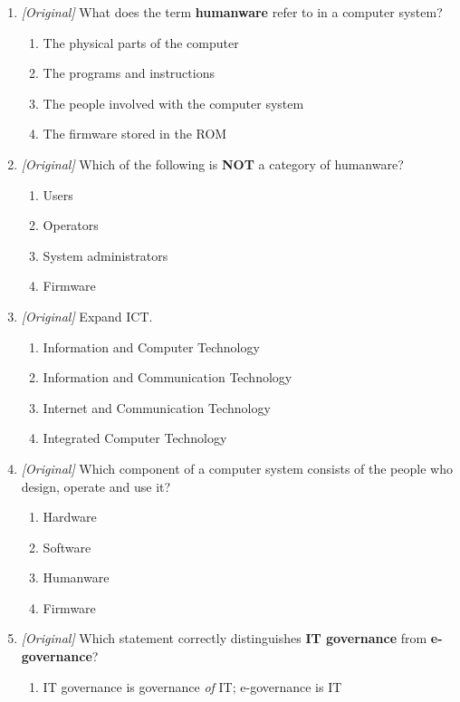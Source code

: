\begin{enumerate}[label=\textbf{Q\arabic*.}, leftmargin=*]
\item \textit{[Original]} What does the term \textbf{humanware} refer to in a
  computer system?
  \begin{enumerate}[label=\Alph*.]
    \item The physical parts of the computer
    \item The programs and instructions
    \item The people involved with the computer system
    \item The firmware stored in the ROM
  \end{enumerate}
\item \textit{[Original]} Which of the following is \textbf{NOT} a category of
  humanware?
  \begin{enumerate}[label=\Alph*.]
    \item Users
    \item Operators
    \item System administrators
    \item Firmware
  \end{enumerate}
\item \textit{[Original]} Expand ICT.
  \begin{enumerate}[label=\Alph*.]
    \item Information and Computer Technology
    \item Information and Communication Technology
    \item Internet and Communication Technology
    \item Integrated Computer Technology
  \end{enumerate}
\item \textit{[Original]} Which component of a computer system consists of the
  people who design, operate and use it?
  \begin{enumerate}[label=\Alph*.]
    \item Hardware
    \item Software
    \item Humanware
    \item Firmware
  \end{enumerate}
\item \textit{[Original]} Which statement correctly distinguishes
  \textbf{IT governance} from \textbf{e-governance}?
  \begin{enumerate}[label=\Alph*.]
    \item IT governance is governance \emph{of} IT; e-governance is IT

\end{enumerate}
\end{enumerate}
